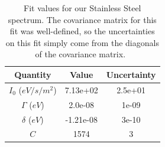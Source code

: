\documentclass[reprint, nobibnotes, amssymb, amsmath, amsfonts, mathtools, mathrsfs, floatfix]{revtex4-1}
\begin{document}
      \begin{table}[h]
        \centering
        \begin{tabular}{|c|c|c|}
          \hline
          Quantity & Value & Uncertainty \\ \hline \hline
          $I_0$ ($eV/s/m^2$) & 7.13e+02 & 2.5e+01 \\ \hline \hline
          $\Gamma$ ($eV$) & 2.0e-08 & 1e-09 \\ \hline \hline
          $\delta$ ($eV$) & -1.21e-08 & 3e-10 \\ \hline \hline
          $C$ & 1574 & 3 \\ \hline
        \end{tabular}
        \caption{Fit values for our Stainless Steel spectrum.  The covariance matrix for this fit was well-defined, so the uncertainties on this fit simply come from the diagonals of the covariance matrix.~\label{tab:ss_fit_stats}}
      \end{table}
\end{document}
